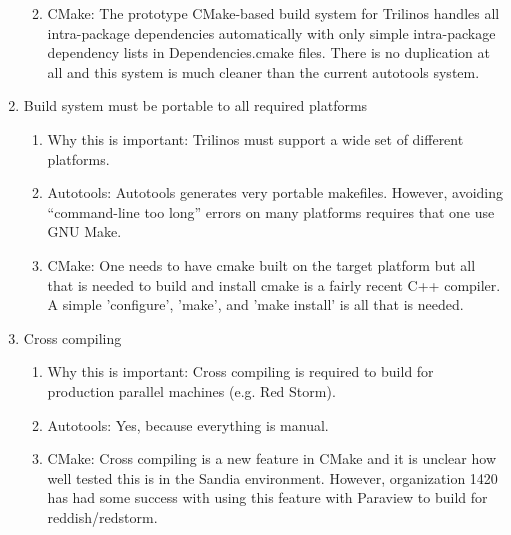 \documentclass[pdf,ps2pdf,11pt]{SANDreport}
\begin{document}
\begin{enumerate}
\begin{enumerate}
  {}\item CMake: The prototype CMake-based build system for Trilinos
  handles all intra-package dependencies automatically with only simple
  intra-package dependency lists in Dependencies.cmake files.  There
  is no duplication at all and this system is much cleaner than the
  current autotools system.

  \end{enumerate}

{}\item Build system must be portable to all required platforms

  \begin{enumerate}

  {}\item Why this is important: Trilinos must support a wide set of
  different platforms.

  {}\item Autotools: Autotools generates very portable makefiles.
  However, avoiding ``command-line too long'' errors on many
  platforms requires that one use GNU Make.

  {}\item CMake: One needs to have cmake built on the target
  platform but all that is needed to build and install cmake is a
  fairly recent C++ compiler.  A simple 'configure', 'make', and
  'make install' is all that is needed. 

  \end{enumerate}

{}\item Cross compiling

  \begin{enumerate}

  {}\item Why this is important: Cross compiling is required to build
  for production parallel machines (e.g. Red Storm).

  {}\item Autotools: Yes, because everything is manual.

  {}\item CMake: Cross compiling is a new feature in CMake and it is
  unclear how well tested this is in the Sandia environment.  However,
  organization 1420 has had some success with using this feature with
  Paraview to build for reddish/redstorm.

  \end{enumerate}

\end{enumerate}
\end{document}
